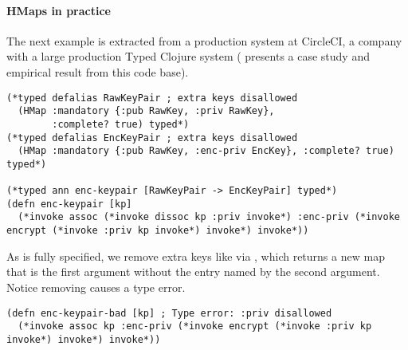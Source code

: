 \paragraph{HMaps in practice} The next example is extracted from a production system at CircleCI,
a company with a large production Typed Clojure system
( presents a case study and empirical
result from this code base).

\newpage

\begin{exmp}
\begin{lstlisting}
(*typed defalias RawKeyPair ; extra keys disallowed
  (HMap :mandatory {:pub RawKey, :priv RawKey}, 
        :complete? true) typed*)
(*typed defalias EncKeyPair ; extra keys disallowed
  (HMap :mandatory {:pub RawKey, :enc-priv EncKey}, :complete? true) typed*)

(*typed ann enc-keypair [RawKeyPair -> EncKeyPair] typed*)
(defn enc-keypair [kp]
  (*invoke assoc (*invoke dissoc kp :priv invoke*) :enc-priv (*invoke encrypt (*invoke :priv kp invoke*) invoke*) invoke*))
\end{lstlisting}
\label{example:circleci}
\end{exmp}
%
%
As  is fully specified, we remove extra keys like 
via , which returns a new map that is the first argument without the
entry named by the second argument. Notice removing  causes a type error.
%
\begin{lstlisting}
(defn enc-keypair-bad [kp] ; Type error: :priv disallowed
  (*invoke assoc kp :enc-priv (*invoke encrypt (*invoke :priv kp invoke*) invoke*) invoke*))
\end{lstlisting}


